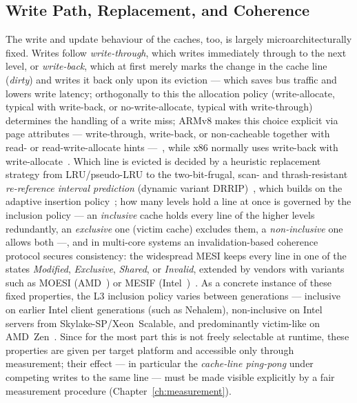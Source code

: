 \begin{nurlang}
\subsection{Write Path, Replacement, and Coherence}\label{subsec:write-coherence}
The write and update behaviour of the caches, too, is largely microarchitecturally fixed. Writes follow
\emph{write-through}, which writes immediately through to the next level, or \emph{write-back}, which at
first merely marks the change in the cache line (\emph{dirty}) and writes it back only upon its eviction
--- which saves bus traffic and lowers write latency; orthogonally to this the allocation policy
(write-allocate, typical with write-back, or
no-write-allocate, typical with write-through) determines the handling of a write miss; ARMv8 makes this
choice explicit via page
attributes --- write-through, write-back, or non-cacheable together with read- or read-write-allocate
hints ---~\cite{arm_arm}, while x86 normally uses write-back with write-allocate~\cite{intel_sdm}. Which
line is evicted is decided by a heuristic replacement strategy from LRU/pseudo-LRU to the two-bit-frugal,
scan- and thrash-resistant
\emph{re-reference interval prediction} (dynamic variant DRRIP)~\cite{jaleel2010rrip}, which builds on
the adaptive insertion policy~\cite{qureshi2007adaptive}; how many levels hold a
line at once is governed by the inclusion policy --- an \emph{inclusive} cache holds every line of the
higher levels redundantly, an \emph{exclusive} one (victim cache) excludes them, a \emph{non-inclusive}
one allows both ---, and in multi-core systems an invalidation-based
coherence protocol secures consistency: the widespread MESI keeps every line in one of the states
\emph{Modified}, \emph{Exclusive}, \emph{Shared}, or \emph{Invalid}, extended by vendors with variants
such as MOESI (AMD~\cite{amd_sog}) or MESIF
(Intel~\cite{intel_optimization})~\cite{hennessy2019architecture}. As a concrete instance of these fixed
properties, the L3
inclusion policy varies between generations --- inclusive on earlier Intel client generations (such as
Nehalem), non-inclusive on
Intel servers from Skylake-SP/Xeon~Scalable, and predominantly victim-like on
AMD~Zen~\cite{intel_optimization,amd_sog}.
Since for the most part this is not freely selectable at runtime, these properties are given per target platform and
accessible only through measurement; their effect --- in particular the \emph{cache-line ping-pong} under
competing writes to the same line --- must be made visible explicitly by a fair measurement procedure
(Chapter~\ref{ch:measurement}).
\end{nurlang}
